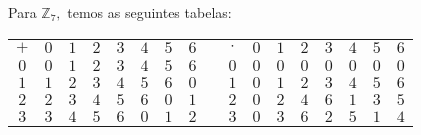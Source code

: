 \documentclass[12pt, a4paper]{article}
\begin{document}
\begin{solution}
Para $\mathbb{Z}_7,$ temos as seguintes tabelas:
\begin{center}
\begin{table}[h]
\begin{tabular}{ccccccccccccccccc}
\textbf{$+$}             & $0$                      & $1$                      & $2$                      & $3$                      & $4$                      & $5$                      & $6$                      &  & \textbf{$\cdot$}         & $0$                      & $1$                      & $2$                      & $3$                      & $4$                      & $5$                      & $6$                      \\ \cline{2-8} \cline{11-17} 
\multicolumn{1}{c|}{$0$} & \multicolumn{1}{c|}{$0$} & \multicolumn{1}{c|}{$1$} & \multicolumn{1}{c|}{$2$} & \multicolumn{1}{c|}{$3$} & \multicolumn{1}{c|}{$4$} & \multicolumn{1}{c|}{$5$} & \multicolumn{1}{c|}{$6$} &  & \multicolumn{1}{c|}{$0$} & \multicolumn{1}{c|}{$0$} & \multicolumn{1}{c|}{$0$} & \multicolumn{1}{c|}{$0$} & \multicolumn{1}{c|}{$0$} & \multicolumn{1}{c|}{$0$} & \multicolumn{1}{c|}{$0$} & \multicolumn{1}{c|}{$0$} \\ \cline{2-8} \cline{11-17} 
\multicolumn{1}{c|}{$1$} & \multicolumn{1}{c|}{$1$} & \multicolumn{1}{c|}{$2$} & \multicolumn{1}{c|}{$3$} & \multicolumn{1}{c|}{$4$} & \multicolumn{1}{c|}{$5$} & \multicolumn{1}{c|}{$6$} & \multicolumn{1}{c|}{$0$} &  & \multicolumn{1}{c|}{$1$} & \multicolumn{1}{c|}{$0$} & \multicolumn{1}{c|}{$1$} & \multicolumn{1}{c|}{$2$} & \multicolumn{1}{c|}{$3$} & \multicolumn{1}{c|}{$4$} & \multicolumn{1}{c|}{$5$} & \multicolumn{1}{c|}{$6$} \\ \cline{2-8} \cline{11-17} 
\multicolumn{1}{c|}{$2$} & \multicolumn{1}{c|}{$2$} & \multicolumn{1}{c|}{$3$} & \multicolumn{1}{c|}{$4$} & \multicolumn{1}{c|}{$5$} & \multicolumn{1}{c|}{$6$} & \multicolumn{1}{c|}{$0$} & \multicolumn{1}{c|}{$1$} &  & \multicolumn{1}{c|}{$2$} & \multicolumn{1}{c|}{$0$} & \multicolumn{1}{c|}{$2$} & \multicolumn{1}{c|}{$4$} & \multicolumn{1}{c|}{$6$} & \multicolumn{1}{c|}{$1$} & \multicolumn{1}{c|}{$3$} & \multicolumn{1}{c|}{$5$} \\ \cline{2-8} \cline{11-17} 
\multicolumn{1}{c|}{$3$} & \multicolumn{1}{c|}{$3$} & \multicolumn{1}{c|}{$4$} & \multicolumn{1}{c|}{$5$} & \multicolumn{1}{c|}{$6$} & \multicolumn{1}{c|}{$0$} & \multicolumn{1}{c|}{$1$} & \multicolumn{1}{c|}{$2$} &  & \multicolumn{1}{c|}{$3$} & \multicolumn{1}{c|}{$0$} & \multicolumn{1}{c|}{$3$} & \multicolumn{1}{c|}{$6$} & \multicolumn{1}{c|}{$2$} & \multicolumn{1}{c|}{$5$} & \multicolumn{1}{c|}{$1$} & \multicolumn{1}{c|}{$4$} \\ \cline{2-8} \cline{11-17} 

\end{tabular}
\end{table}
\end{center}
\end{solution}
\end{document}
